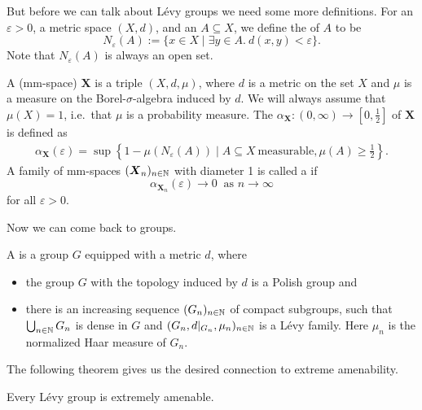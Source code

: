 		
		
But before we can talk about L\'evy groups we need some more definitions. For an $\varepsilon>0$, a metric space $(X,d)$, and an $A\subseteq X$, we define the  of $A$ to be 
\[N_\varepsilon(A):=\{x\in X\mid\exists y\in A.\  d(x,y)<\varepsilon\}.\]
Note that $N_\varepsilon(A)$ is always an open set.
\begin{definition}
	A  (mm-space) $\boldsymbol{X}$ is a triple $(X,d,\mu)$, where $d$ is a metric on the set $X$ and $\mu$ is a measure on the Borel-$\sigma$-algebra induced by $d$. We will always assume that $\mu(X)=1$, i.e.\ that $\mu$ is a probability measure.  
	The  $\alpha_{\boldsymbol{X}}\colon(0,\infty)\to[0,\frac{1}{2}]$ of $\boldsymbol{X}$ is defined as 
	\begin{align*}
		\alpha_{\boldsymbol{X}}(\varepsilon)=\sup\left\lbrace1-\mu(N_\varepsilon(A))\mid A\subseteq X\ \text{measurable}, \mu(A)\geq\frac{1}{2}\right\rbrace. 
	\end{align*}
	A family of mm-spaces $(\boldsymbol{X}_n)_{n\in\mathbb{N}}$ with diameter 1 is called a  if 
	\[\alpha_{\boldsymbol{X}_n}(\varepsilon)\to 0\ \text{ as $n\to\infty$}\]
	for all $\varepsilon>0$.
\end{definition}
		
Now we can come back to groups.
\begin{definition}\label{def:Levy}
	A  is a group $G$ equipped with a metric $d$, where
	\begin{itemize}
		\item the group $G$ with the topology induced by $d$ is a Polish group and
		\item there is an increasing sequence $(G_n)_{n\in\mathbb{N}}$ of compact subgroups, such that $\bigcup_{n\in\mathbb{N}} G_n$ is dense in $G$ and $(G_n,d|_{G_n},\mu_n)_{n\in\mathbb{N}}$ is a L\'evy family. Here $\mu_n$ is the normalized Haar measure of $G_n$.
	\end{itemize}  
\end{definition}
The following theorem gives us the desired connection to extreme amenability.
\begin{theorem}\label{thm:LevyImpliesExAm}
Every L\'evy group is extremely amenable.
\end{theorem}

